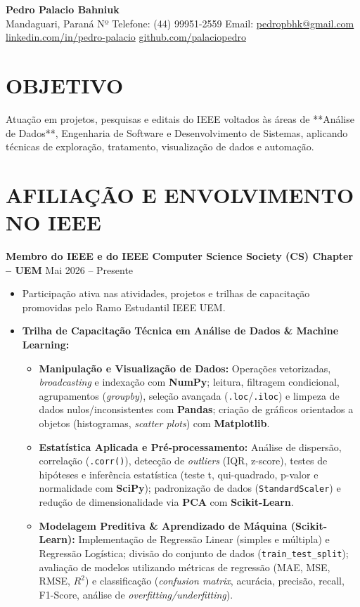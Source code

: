 \documentclass[a4paper,10pt]{article}
\begin{document}
\begin{center}
    {\LARGE \textbf{Pedro Palacio Bahniuk}} 
    \\ [0.1cm]
    Mandaguari, Paraná
    {\textbullet}
    Nº Telefone: (44) 99951-2559 
    {\textbullet}
    Email: \href{mailto:pedropbhk@gmail.com}{pedropbhk@gmail.com} 
    \\
    \href{https://www.linkedin.com/in/pedro-palacio}{linkedin.com/in/pedro-palacio} 
    {\textbullet}
    \href{https://github.com/palaciopedro}{github.com/palaciopedro}
\end{center}

\section{OBJETIVO}
Atuação em projetos, pesquisas e editais do IEEE voltados às áreas de **Análise de Dados**, Engenharia de Software e Desenvolvimento de Sistemas, aplicando técnicas de exploração, tratamento, visualização de dados e automação.

\section{AFILIAÇÃO E ENVOLVIMENTO NO IEEE}
\textbf{Membro do IEEE e do IEEE Computer Science Society (CS) Chapter -- UEM} \hfill Mai 2026 -- Presente
\begin{itemize}
    \item Participação ativa nas atividades, projetos e trilhas de capacitação promovidas pelo Ramo Estudantil IEEE UEM.
    \item \textbf{Trilha de Capacitação Técnica em Análise de Dados \& Machine Learning:}
    \begin{itemize}
        \item \textbf{Manipulação e Visualização de Dados:} Operações vetorizadas, \textit{broadcasting} e indexação com \textbf{NumPy}; leitura, filtragem condicional, agrupamentos (\textit{groupby}), seleção avançada (\texttt{.loc}/\texttt{.iloc}) e limpeza de dados nulos/inconsistentes com \textbf{Pandas}; criação de gráficos orientados a objetos (histogramas, \textit{scatter plots}) com \textbf{Matplotlib}.
        \item \textbf{Estatística Aplicada e Pré-processamento:} Análise de dispersão, correlação (\texttt{.corr()}), detecção de \textit{outliers} (IQR, z-score), testes de hipóteses e inferência estatística (teste t, qui-quadrado, p-valor e normalidade com \textbf{SciPy}); padronização de dados (\texttt{StandardScaler}) e redução de dimensionalidade via \textbf{PCA} com \textbf{Scikit-Learn}.
        \item \textbf{Modelagem Preditiva \& Aprendizado de Máquina (Scikit-Learn):} Implementação de Regressão Linear (simples e múltipla) e Regressão Logística; divisão do conjunto de dados (\texttt{train\_test\_split}); avaliação de modelos utilizando métricas de regressão (MAE, MSE, RMSE, $R^2$) e classificação (\textit{confusion matrix}, acurácia, precisão, recall, F1-Score, análise de \textit{overfitting/underfitting}).
    \end{itemize}
\end{itemize}
\end{document}
